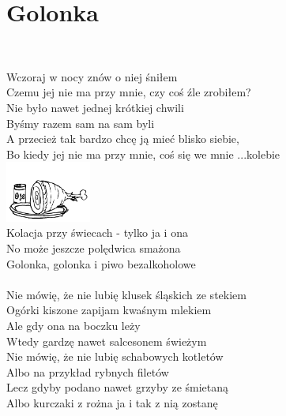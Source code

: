 \documentclass[a5paper, 10pt]{book}
\begin{document}
\section{Golonka}\textcolor{lightgray}{\textit{}}\vspace*{2mm}\\
\begin{minipage}[t]{0.77\textwidth}
  Wczoraj w nocy znów o niej śniłem\\
  Czemu jej nie ma przy mnie, czy coś źle zrobiłem?\\
  Nie było nawet jednej krótkiej chwili\\
  Byśmy razem sam na sam byli\vspace*{2mm}
  \\
  A przecież tak bardzo chcę ją mieć blisko siebie,\\
  Bo kiedy jej nie ma przy mnie, coś się we mnie ...kolebie\\
  \includegraphics[height=20mm,right]{images/golonka.png}\vspace*{-21mm}\\
  Kolacja przy świecach - tylko ja i ona\\
  No może jeszcze polędwica smażona\\

  \hspace*{5mm}Golonka, golonka i piwo bezalkoholowe\\
  \\
  Nie mówię, że nie lubię klusek śląskich ze stekiem\\
  Ogórki kiszone zapijam kwaśnym mlekiem\\
  Ale gdy ona na boczku leży\\
  Wtedy gardzę nawet salcesonem świeżym\vspace*{2mm}
  \\
  Nie mówię, że nie lubię schabowych kotletów\\
  Albo na przykład rybnych filetów\\
  Lecz gdyby podano nawet grzyby ze śmietaną\\
  Albo kurczaki z rożna ja i tak z nią zostanę\\
\end{minipage}
\end{document}
